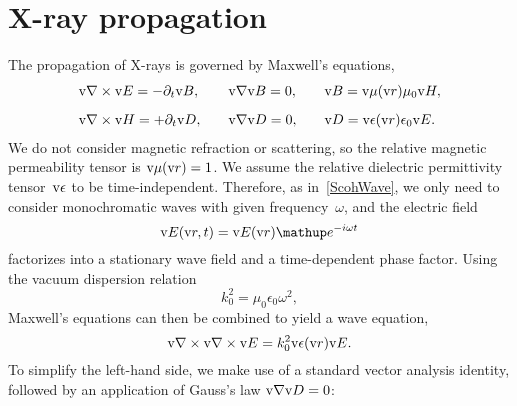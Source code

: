 %
%

\section{X-ray propagation}\label{SXray}
%
%

The propagation of X-rays is governed by Maxwell's equations,
%
\begin{equation}
  \begin{array}{lll}
    \text{v}{\nabla}\times\text{v}{E}=-\partial_t \text{v}{B},\quad
   &\text{v}{\nabla}\text{v}{B}=0,\quad
   &\text{v}{B}=\text{v}{\mu}(\text{v}{r})\mu_0\text{v}{H},
   \\[2ex]
    \text{v}{\nabla}\times\text{v}{H}=+\partial_t \text{v}{D},\quad
   &\text{v}{\nabla}\text{v}{D}=0,\quad
   &\text{v}{D}=\text{v}{\epsilon}(\text{v}{r})\epsilon_0\text{v}{E}.
  \end{array}
\end{equation}
We do not consider magnetic refraction or scattering,
so the relative magnetic permeability tensor is $\text{v}{\mu}(\text{v}{r})=1$.
%
%
We assume the relative dielectric permittivity tensor~$\text{v}{\epsilon}$
%
%
to be time-independent.
Therefore, as in~\cref{ScohWave}, we only need to consider monochromatic waves
%
%
with given frequency~$\omega$, and the electric field
%
\begin{equation}
  \v{E}(\r,t) = \v{E}(\r)\e^{-i\omega t}
\end{equation}
factorizes into a stationary wave field and a time-dependent phase factor.
Using the vacuum dispersion relation
\begin{equation}
  k_0^2 = \mu_0\epsilon_0\omega^2,
\end{equation}
%
Maxwell's equations can then be combined to yield a wave equation,
\begin{equation}\label{ENabNabE}
  \text{v}{\nabla}\times\text{v}{\nabla}\times\text{v}{E} = k_0^2\text{v}{\epsilon}(\text{v}{r})\text{v}{E}.
\end{equation}
%
To simplify the left-hand side,
we make use of a standard vector analysis identity,
followed by an application of Gauss's law $\text{v}{\nabla}\text{v}{D}=0$:
